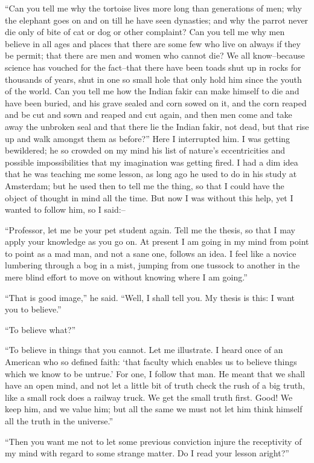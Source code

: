 \documentclass[12pt,openright]{book}
\begin{document}
“Can you tell me why the tortoise lives more long than generations of men; why the elephant goes on and on till he have seen dynasties; and why the parrot never die only of bite of cat or dog or other complaint? Can you tell me why men believe in all ages and places that there are some few who live on always if they be permit; that there are men and women who cannot die? We all know–because science has vouched for the fact–that there have been toads shut up in rocks for thousands of years, shut in one so small hole that only hold him since the youth of the world. Can you tell me how the Indian fakir can make himself to die and have been buried, and his grave sealed and corn sowed on it, and the corn reaped and be cut and sown and reaped and cut again, and then men come and take away the unbroken seal and that there lie the Indian fakir, not dead, but that rise up and walk amongst them as before?” Here I interrupted him. I was getting bewildered; he so crowded on my mind his list of nature’s eccentricities and possible impossibilities that my imagination was getting fired. I had a dim idea that he was teaching me some lesson, as long ago he used to do in his study at Amsterdam; but he used then to tell me the thing, so that I could have the object of thought in mind all the time. But now I was without this help, yet I wanted to follow him, so I said:–

“Professor, let me be your pet student again. Tell me the thesis, so that I may apply your knowledge as you go on. At present I am going in my mind from point to point as a mad man, and not a sane one, follows an idea. I feel like a novice lumbering through a bog in a mist, jumping from one tussock to another in the mere blind effort to move on without knowing where I am going.”

“That is good image,” he said. “Well, I shall tell you. My thesis is this: I want you to believe.”

“To believe what?”

“To believe in things that you cannot. Let me illustrate. I heard once of an American who so defined faith: ‘that faculty which enables us to believe things which we know to be untrue.’ For one, I follow that man. He meant that we shall have an open mind, and not let a little bit of truth check the rush of a big truth, like a small rock does a railway truck. We get the small truth first. Good! We keep him, and we value him; but all the same we must not let him think himself all the truth in the universe.”

“Then you want me not to let some previous conviction injure the receptivity of my mind with regard to some strange matter. Do I read your lesson aright?”
\end{document}

